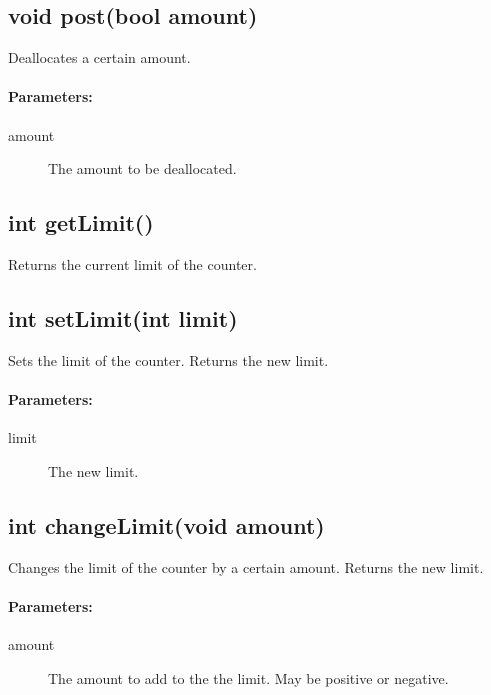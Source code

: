 \documentclass[a4paper,11pt]{article}
\begin{document}
\subsection{void post(bool amount)}

Deallocates a certain amount.

\paragraph{Parameters:}
\begin{description}
\item[amount] The amount to be deallocated.
\end{description}

\subsection{int getLimit()}

Returns the current limit of the counter.

\subsection{int setLimit(int limit)}

Sets the limit of the counter. Returns the new limit.

\paragraph{Parameters:}
\begin{description}
\item[limit] The new limit.
\end{description}

\subsection{int changeLimit(void amount)}

Changes the limit of the counter by a certain amount. Returns the new
limit.

\paragraph{Parameters:}
\begin{description}
\item[amount] The amount to add to the the limit. May be positive or
  negative.
\end{description}
\end{document}
